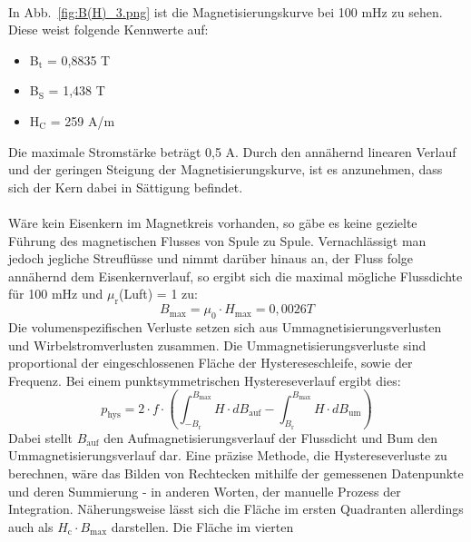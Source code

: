 \documentclass[a4paper,twoside,12pt,DIV=13,BCOR=5mm,numbers=noenddot,cleardoublepage=empty]{scrbook}
\begin{document}
        \\
        In Abb.~\ref{fig:B(H)_3.png} ist die Magnetisierungskurve bei 100 mHz zu sehen. 
        Diese weist folgende Kennwerte auf:
        \begin{itemize}
            \item B$_\mathrm{t}$ = 0,8835 T
            \item B$_\mathrm{S}$ = 1,438 T
            \item H$_\mathrm{C}$ = 259 A/m
        \end{itemize}
        Die maximale Stromst\"arke betr\"agt 0,5 A. Durch den ann\"ahernd linearen 
        Verlauf und der geringen Steigung der Magnetisierungskurve, ist es 
        anzunehmen, dass sich der Kern dabei in S\"attigung befindet.
        \\
        \\
        W\"are kein Eisenkern im Magnetkreis vorhanden, so g\"abe es keine 
        gezielte F\"uhrung des magnetischen Flusses von Spule zu Spule. 
        Vernachl\"assigt man jedoch jegliche Streufl\"usse und nimmt dar\"uber 
        hinaus an, der Fluss folge ann\"ahernd dem Eisenkernverlauf, so ergibt 
        sich die maximal m\"ogliche Flussdichte f\"ur 100 mHz und 
        $\mu_\mathrm{r}$(Luft) = 1 zu:
        \begin{equation}
            B_\mathrm{max} = \mu_\mathrm{0} \cdot H_\mathrm{max} = 0,0026 T
        \end{equation}
        Die volumenspezifischen Verluste setzen sich aus 
        Ummagnetisierungsverlusten und Wirbelstromverlusten zusammen. Die 
        Ummagnetisierungsverluste sind proportional der eingeschlossenen 
        Fl\"ache der Hystereseschleife, sowie der Frequenz. Bei einem 
        punktsymmetrischen Hystereseverlauf ergibt dies:
        \begin{equation}
            p_\mathrm{hys} = 2 \cdot f \cdot (\int_{-B_\mathrm{r}}^{B_\mathrm{max}}H \cdot dB_\mathrm{auf} - \int_{B_\mathrm{r}}^{B_\mathrm{max}}H \cdot dB_\mathrm{um})
        \end{equation}
        Dabei stellt $B_\mathrm{auf}$ den Aufmagnetisierungsverlauf der Flussdicht und Bum den 
        Ummagnetisierungsverlauf dar. Eine pr\"azise Methode, die Hystereseverluste 
        zu berechnen, w\"are das Bilden von Rechtecken mithilfe der gemessenen
        Datenpunkte und deren Summierung - in anderen Worten, der manuelle 
        Prozess der Integration. N\"aherungsweise l\"asst sich die Fl\"ache im ersten 
        Quadranten allerdings auch als $H_\mathrm{c} \cdot B_\mathrm{max}$ darstellen. Die Fl\"ache im vierten 
\end{document}
